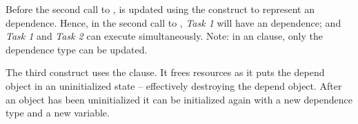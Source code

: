 Before the second call to ,  is updated 
using the  construct to represent an  dependence. 
Hence, in the second call to , \emph{Task 1}
will have an  dependence; and \emph{Task 1} and 
\emph{Task 2} can execute simultaneously. Note: in an 
clause, only the dependence type can be updated.

The third  construct uses the  clause.
It frees resources as it puts the depend object in an uninitialized state --
effectively destroying the depend object.
After an object has been uninitialized it can be initialized again
with a new dependence type and a new variable.


